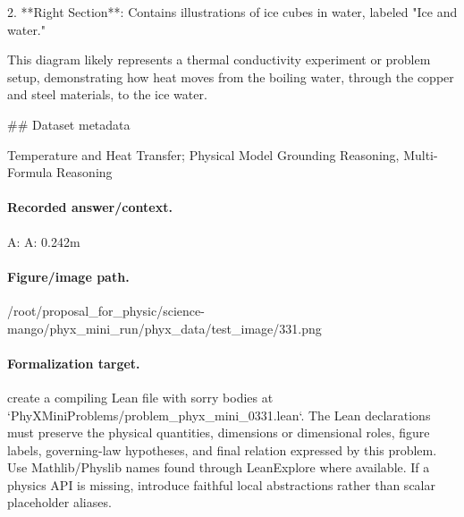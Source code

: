 2. **Right Section**: Contains illustrations of ice cubes in water, labeled "Ice and water."

This diagram likely represents a thermal conductivity experiment or problem setup, demonstrating how heat moves from the boiling water, through the copper and steel materials, to the ice water.

\#\# Dataset metadata

Temperature and Heat Transfer; Physical Model Grounding Reasoning, Multi-Formula Reasoning

\paragraph{Recorded answer/context.}
A: A: 0.242m

\paragraph{Figure/image path.}
/root/proposal\_for\_physic/science-mango/phyx\_mini\_run/phyx\_data/test\_image/331.png

\paragraph{Formalization target.}
create a compiling Lean file with sorry bodies at `PhyXMiniProblems/problem\_phyx\_mini\_0331.lean`. The Lean declarations must preserve the physical quantities, dimensions or dimensional roles, figure labels, governing-law hypotheses, and final relation expressed by this problem.
Use Mathlib/Physlib names found through LeanExplore where available. If a physics API is missing, introduce faithful local abstractions rather than scalar placeholder aliases.

